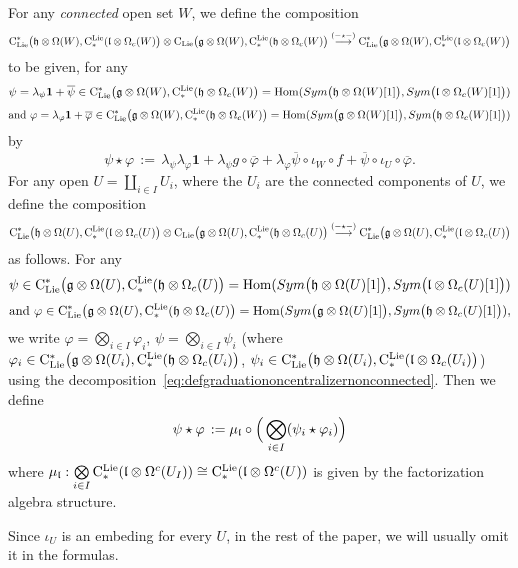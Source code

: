 \documentclass[11pt]{amsart}
\numberwithin{equation}{section}
\begin{document}
\begin{dfn}\label{def:comp}
For any \emph{connected} open set $W$, we define  the composition 
$${\rm C}_{\rm Lie}^*\big(\mathfrak h \otimes \Omega(W), {\rm C}^{\rm Lie}_*(\mathfrak l \otimes \Omega_c(W)  \big) \otimes 
{\rm C}_{{\rm Lie}}\big(\mathfrak g \otimes \Omega(W), {\rm C}^{\rm Lie}_*(\mathfrak h \otimes \Omega_c(W)  \big)
\stackrel{(-\star-)}\longrightarrow 
{\rm C}_{\rm Lie}^*\big(\mathfrak g \otimes \Omega(W), {\rm C}^{\rm Lie}_*(\mathfrak l \otimes \Omega_c(W)  \big)
$$ to be given, for any $$\psi=\lambda_\psi \mathbf{1} +\overline{\psi} \in {\rm C}_{\rm Lie}^*\big(\mathfrak g \otimes \Omega(W), {\rm C}^{\rm Lie}_*(\mathfrak h \otimes \Omega_c(W)  \big)=
{\rm Hom}(Sym\big( \mathfrak h\otimes  \Omega (W) [1]\big), Sym\big( \mathfrak l\otimes  \Omega_c (W) [1]\big))$$
$$\mbox{and }\varphi =\lambda_\varphi \mathbf{1} +\overline{\varphi}\in {\rm C}_{\rm Lie}^*\big(\mathfrak g \otimes \Omega(W), {\rm C}^{\rm Lie}_*(\mathfrak h \otimes \Omega_c(W)  \big)= 
{\rm Hom}(Sym\big( \mathfrak g\otimes  \Omega (W) [1]\big), Sym\big( \mathfrak h\otimes  \Omega_c (W) [1]\big)) $$ by 
$$ \psi \star \varphi \, := \, \lambda_{\psi} \lambda_{\varphi} \mathbf{1}+
\lambda_\psi g\circ \overline{\varphi} + \lambda_{\varphi} \overline{\psi} \circ \iota_W \circ f +\overline{\psi} \circ \iota_U \circ \overline{\varphi} . $$
For any open 
$U=\coprod\limits_{i\in I}U_i$, where the $U_i$ are the connected components of $U$,  we define  the composition 
$${\rm C}_{\rm Lie}^*\big(\mathfrak h \otimes \Omega(U), {\rm C}^{\rm Lie}_*(\mathfrak l \otimes \Omega_c(U)  \big) \otimes 
{\rm C}_{{\rm Lie}}\big(\mathfrak g \otimes \Omega(U), {\rm C}^{\rm Lie}_*(\mathfrak h \otimes \Omega_c(U)  \big)
\stackrel{(-\star-)}\longrightarrow 
{\rm C}_{\rm Lie}^*\big(\mathfrak g \otimes \Omega(U), {\rm C}^{\rm Lie}_*(\mathfrak l \otimes \Omega_c(U)  \big)
$$ as follows. For any $$\psi \in {\rm C}_{\rm Lie}^*\big(\mathfrak g \otimes \Omega(U), {\rm C}^{\rm Lie}_*(\mathfrak h \otimes \Omega_c(U)  \big)=
{\rm Hom}(Sym\big( \mathfrak h\otimes  \Omega (U) [1]\big), Sym\big( \mathfrak l\otimes  \Omega_c (U) [1]\big))$$
$$\mbox{and }\varphi \in {\rm C}_{\rm Lie}^*\big(\mathfrak g \otimes \Omega(U), {\rm C}^{\rm Lie}_*(\mathfrak h \otimes \Omega_c(U)  \big)= 
{\rm Hom}(Sym\big( \mathfrak g\otimes  \Omega (U) [1]\big), Sym\big( \mathfrak h\otimes  \Omega_c (U) [1]\big)), $$ we write 
$\varphi = \mathop{\bigotimes}\limits_{i\in I} \varphi_i$, $\psi= \mathop{\bigotimes}\limits_{i\in I} \psi_i$ 
(where $\varphi_i \in {\rm C}_{\rm Lie}^*\big(\mathfrak g \otimes \Omega(U_i), {\rm C}^{\rm Lie}_*(\mathfrak h \otimes \Omega_c(U_i)  \big)$,
$\psi_i\in {\rm C}_{\rm Lie}^*\big(\mathfrak h \otimes \Omega(U_i), {\rm C}^{\rm Lie}_*(\mathfrak l \otimes \Omega_c(U_i)  \big)$) 
 using the decomposition~\eqref{eq:defgraduationoncentralizernonconnected}. Then we define
\begin{equation} \label{eqdef:staronnonconnected}
\psi \star \varphi \, := \mu_{\mathfrak l} \circ \Big( \bigotimes\limits_{i\in I} (\psi_i \star \varphi_i)\Big) \end{equation}
where $\mu_{\mathfrak l}: \mathop{\bigotimes}\limits_{i\in I} {\rm C}^{\rm Lie}_*(\mathfrak l\otimes \Omega^c(U_I)) \cong {\rm C}^{\rm Lie}_*(\mathfrak l\otimes \Omega^c(U))$ 
is given by the factorization algebra 
structure. 
\end{dfn}
Since $\iota_U$ is an embeding for every $U$, in the rest of the paper, we will usually 
omit it in the formulas. 
\end{document}
